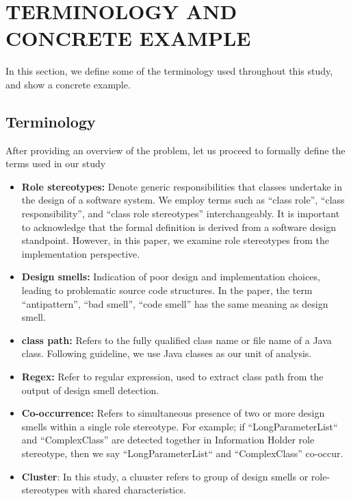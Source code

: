 \documentclass[AMA,Times1COL]{WileyNJDv5} %
\begin{document}
\section{TERMINOLOGY AND CONCRETE EXAMPLE}\label{sec:terminologies}
In this section, we define some of the terminology used throughout this study, and show a concrete example.
\subsection{Terminology}
After providing an overview of the problem, let us proceed to formally define the terms used in our study
\begin{itemize}
	\item \textbf{Role stereotypes:} Denote generic responsibilities that classes undertake in the design of a software system. We employ terms such as ``class role'', ``class responsibility'', and ``class role stereotypes'' interchangeably. It is important to acknowledge that the formal definition is derived from a software design standpoint. However, in this paper, we examine role stereotypes from the implementation perspective.
	
	\item \textbf{Design smells:} Indication of poor design and implementation choices, leading to problematic source code structures. In the paper, the term ``antipattern'', ``bad smell'', ``code smell'' has the same meaning as design smell.
	\item \textbf{class path:} Refers to the fully qualified class name or file name of a Java class. Following \cite{runeson2012case} guideline, we use Java classes as our unit of analysis.
	\item \textbf{Regex:}  Refer to regular expression, used to extract class path from the output of design smell detection.
	\item \textbf{Co-occurrence:} Refers to simultaneous presence of two or more design smells within a single role stereotype. For example; if ``LongParameterList`` and ``ComplexClass'' are detected together in Information Holder role stereotype, then we say  ``LongParameterList`` and ``ComplexClass'' co-occur.
	\item \textbf{Cluster}: In this study, a cluuster refers to group of design smells or role-stereotypes with shared characteristics.
\end{itemize}
\end{document}
